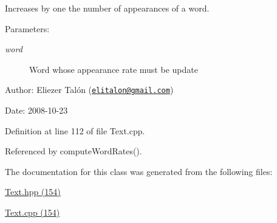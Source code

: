 Increases by one the number of appearances of a word. 

\begin{Desc}
\item[Parameters:]
\begin{description}
\item[{\em word}]Word whose appearance rate must be update\end{description}
\end{Desc}
\begin{Desc}
\item[Author:]Eliezer Talón (\href{mailto:elitalon@gmail.com}{\tt elitalon@gmail.com}) \end{Desc}
\begin{Desc}
\item[Date:]2008-10-23 \end{Desc}


Definition at line 112 of file Text.cpp.

Referenced by computeWordRates().

The documentation for this class was generated from the following files:\begin{CompactItemize}
\item 
\hyperlink{_text_8hpp}{Text.hpp (154)}\item 
\hyperlink{_text_8cpp}{Text.cpp (154)}\end{CompactItemize}
